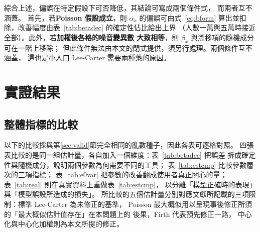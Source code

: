 \documentclass[UTF8, fontset=macnew, a4paper, 12pt]{ctexart}
\begin{document}
綜合上述，偏誤在特定假設下可否降低，其結論可寫成兩個條件式，
而兩者互不涵蓋。
首先，若\textbf{Poisson 假設成立}，則 $\alpha_x$ 的偏誤可由式~\eqref{eq:bform}
算出並扣除，改善幅度由表~\ref{tab:betadec} 的確定性佔比給出上界
（人數一萬與五萬時接近全部）。此外，若\textbf{加權後各格的噪音變異數
大致相等}，則 $\beta_x$ 與漂移項的隨機成分可在一階上移除；
但此條件無法由本文的閉式提供，須另行處理。兩個條件互不涵蓋，
這也是小人口 Lee-Carter 需要兩種藥的原因。


\section{實證結果}\label{sec:result}

\subsection{整體指標的比較}\label{sec:empmain}

以下的比較採與第\ref{sec:valid}節完全相同的亂數種子，因此各表可逐格對照。
四張表比較的是同一組估計量，各自加入一個維度：表~\ref{tab:betadec} 把誤差
拆成確定性與隨機成分，說明兩個參數為何需要不同的工具；
表~\ref{tab:estcmp} 比較參數層次的三項指標；
表~\ref{tab:e0var} 把參數的改善翻成使用者真正關心的量；
表~\ref{tab:real} 則在真實資料上重做表~\ref{tab:estcmp}，
以分離「模型正確時的表現」與「模型誤設所造成的損失」。
所比較的五個估計量分別對應文獻所記載的三項限制：標準 Lee-Carter 為未修正的基準，
Poisson 最大概似用以呈現事後修正所須的「最大概似估計值存在」在本問題上的
後果，Firth 代表預先修正一路，
中心化與中心化加權則為本文所提的修正。
\end{document}
